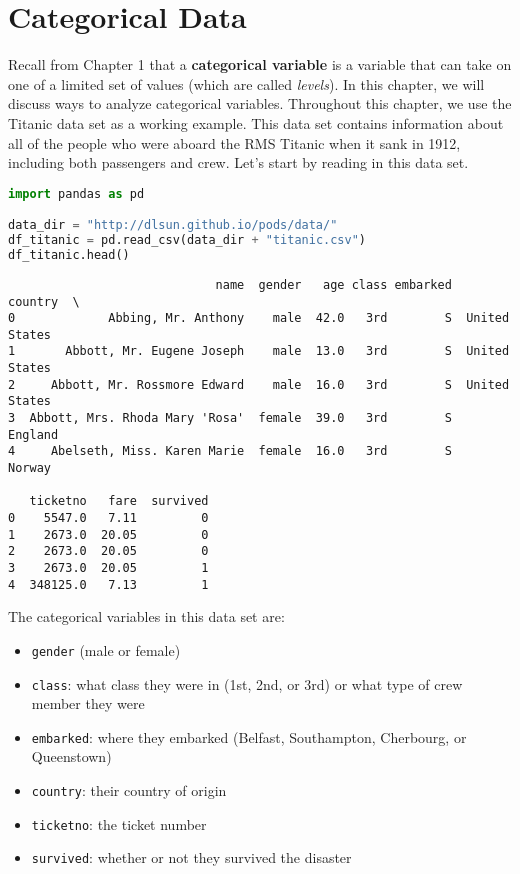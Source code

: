 

\chapter{Categorical Data}\label{Ch.2}

Recall from Chapter 1 that a \textbf{categorical variable} is a variable that can take on one of a limited set of values (which are called \textit{levels}). In this chapter, we will discuss ways to analyze categorical variables. Throughout this chapter, we use the Titanic data set as a working example. This data set contains information about all of the people who were aboard the RMS Titanic when it sank in 1912, including both passengers and crew. Let's start by reading in this data set.

\begin{lstlisting}[language=Python]
import pandas as pd

data_dir = "http://dlsun.github.io/pods/data/"
df_titanic = pd.read_csv(data_dir + "titanic.csv")
df_titanic.head()
\end{lstlisting}

\small\begin{verbatim}
                             name  gender   age class embarked        country  \
0             Abbing, Mr. Anthony    male  42.0   3rd        S  United States   
1       Abbott, Mr. Eugene Joseph    male  13.0   3rd        S  United States   
2     Abbott, Mr. Rossmore Edward    male  16.0   3rd        S  United States   
3  Abbott, Mrs. Rhoda Mary 'Rosa'  female  39.0   3rd        S        England   
4     Abelseth, Miss. Karen Marie  female  16.0   3rd        S         Norway   

   ticketno   fare  survived  
0    5547.0   7.11         0  
1    2673.0  20.05         0  
2    2673.0  20.05         0  
3    2673.0  20.05         1  
4  348125.0   7.13         1  
\end{verbatim}



The categorical variables in this data set are:
\begin{itemize}
\item 
\verb|gender| (male or female)

\item 
\verb|class|: what class they were in (1st, 2nd, or 3rd) or what type of crew member they were

\item 
\verb|embarked|: where they embarked (Belfast, Southampton, Cherbourg, or Queenstown)

\item 
\verb|country|: their country of origin

\item 
\verb|ticketno|: the ticket number

\item 
\verb|survived|: whether or not they survived the disaster

\end{itemize}

